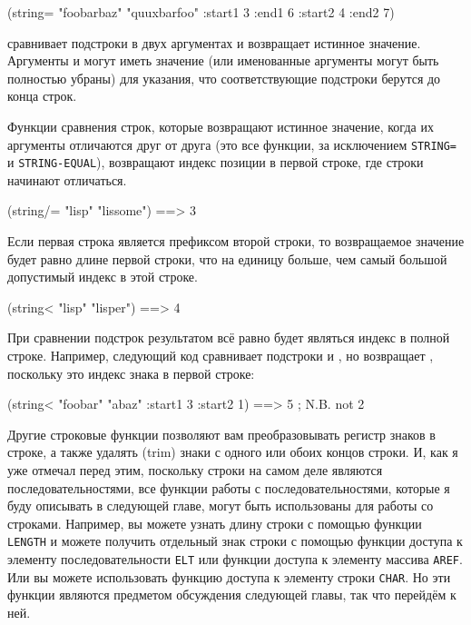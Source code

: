 \begin{myverb}
(string= "foobarbaz" "quuxbarfoo" :start1 3 :end1 6 :start2 4 :end2 7)
\end{myverb}

\noindent{}сравнивает подстроки  в двух аргументах и возвращает истинное
значение.  Аргументы  и  могут иметь значение
 (или именованные аргументы могут быть полностью убраны) для указания, что
соответствующие подстроки берутся до конца строк.

Функции сравнения строк, которые возвращают истинное значение, когда их аргументы
отличаются друг от друга (это все функции, за исключением \lstinline{STRING=} и
\lstinline{STRING-EQUAL}), возвращают индекс позиции в первой строке, где строки начинают
отличаться.

\begin{myverb}
  (string/= "lisp" "lissome") ==> 3
\end{myverb}

Если первая строка является префиксом второй строки, то возвращаемое значение будет равно
длине первой строки, что на единицу больше, чем самый большой допустимый индекс в этой
строке.

\begin{myverb}
  (string< "lisp" "lisper") ==> 4
\end{myverb}

При сравнении подстрок результатом всё равно будет являться индекс в полной строке.
Например, следующий код сравнивает подстроки  и , но возвращает
, поскольку это индекс знака  в первой строке:

\begin{myverb}
  (string< "foobar" "abaz" :start1 3 :start2 1) ==> 5 ; N.B. not 2
\end{myverb}

Другие строковые функции позволяют вам преобразовывать регистр знаков в строке, а также
удалять (trim) знаки с одного или обоих концов строки.  И, как я уже отмечал перед этим,
поскольку строки на самом деле являются последовательностями, все функции работы с
последовательностями, которые я буду описывать в следующей главе, могут быть использованы
для работы со строками.  Например, вы можете узнать длину строки с помощью функции
\lstinline{LENGTH} и можете получить отдельный знак строки с помощью функции доступа к элементу
последовательности \lstinline{ELT} или функции доступа к элементу массива \lstinline{AREF}.
Или вы можете использовать функцию доступа к элементу строки \lstinline{CHAR}.  Но эти
функции являются предметом обсуждения следующей главы, так что перейдём к ней.

